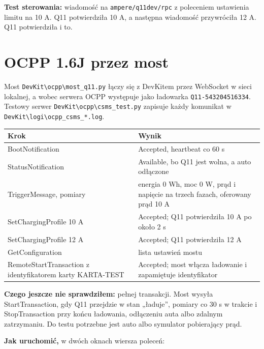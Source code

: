 \documentclass[11pt,a4paper]{article}
\begin{document}
\textbf{Test sterowania:} wiadomość na \texttt{ampere/\allowbreak{}q11dev/\allowbreak{}rpc} z poleceniem ustawienia limitu na 10 A. Q11 potwierdziła 10 A, a następna wiadomość przywróciła 12 A. Q11 potwierdziła i to.


\section{OCPP 1.6J przez most}

Most \texttt{DevKit\textbackslash{}ocpp\textbackslash{}most\_\allowbreak{}q11.\allowbreak{}py} łączy się z DevKitem przez WebSocket w sieci lokalnej, a wobec serwera OCPP występuje jako ładowarka \texttt{Q11-\allowbreak{}543204516334}. Testowy serwer \texttt{DevKit\textbackslash{}ocpp\textbackslash{}csms\_\allowbreak{}test.\allowbreak{}py} zapisuje każdy komunikat w \texttt{DevKit\textbackslash{}logi\textbackslash{}ocpp\_\allowbreak{}csms\_\allowbreak{}*.\allowbreak{}log}.


\begin{longtable}{>{\raggedright\arraybackslash}p{5.80cm}>{\raggedright\arraybackslash}p{9.92cm}}
\toprule
\rowcolor{apteallight}\textbf{Krok} & \textbf{Wynik} \\
\midrule\endhead
\bottomrule\endfoot
BootNotification & Accepted, heartbeat co 60 s \\
StatusNotification & Available, bo Q11 jest wolna, a auto odłączone \\
TriggerMessage, pomiary & energia 0 Wh, moc 0 W, prąd i napięcie na trzech fazach, oferowany prąd 10 A \\
SetChargingProfile 10 A & Accepted; Q11 potwierdziła 10 A po około 2 s \\
SetChargingProfile 12 A & Accepted; Q11 potwierdziła 12 A \\
GetConfiguration & lista ustawień mostu \\
RemoteStartTransaction z identyfikatorem karty KARTA-TEST & Accepted; most włącza ładowanie i zapamiętuje identyfikator \\
\end{longtable}

\textbf{Czego jeszcze nie sprawdziłem:} pełnej transakcji. Most wysyła StartTransaction, gdy Q11 przejdzie w stan „ładuje”, pomiary co 30 s w trakcie i StopTransaction przy końcu ładowania, odłączeniu auta albo zdalnym zatrzymaniu. Do testu potrzebne jest auto albo symulator pobierający prąd.


\textbf{Jak uruchomić,} w dwóch oknach wiersza poleceń:
\end{document}
